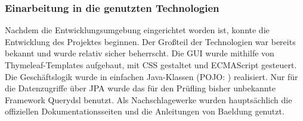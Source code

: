 \subsubsection{Einarbeitung in die genutzten Technologien}
\label{sec:Technologien}
Nachdem die Entwicklungsumgebung eingerichtet worden ist, konnte die Entwicklung des Projektes beginnen. Der Großteil der Technologien war bereits bekannt und wurde relativ sicher beherrscht. Die \ac{GUI} wurde mithilfe von Thymeleaf-Templates aufgebaut, mit CSS gestaltet und ECMAScript gesteuert. Die Geschäftslogik wurde in einfachen Java-Klassen (\acs{POJO}: ) realisiert. Nur für die Datenzugriffe über \ac{JPA} wurde das für den Prüfling bisher unbekannte Framework Querydsl benutzt. Als Nachschlagewerke wurden hauptsächlich die offiziellen Dokumentationsseiten und die Anleitungen von Baeldung genutzt.

